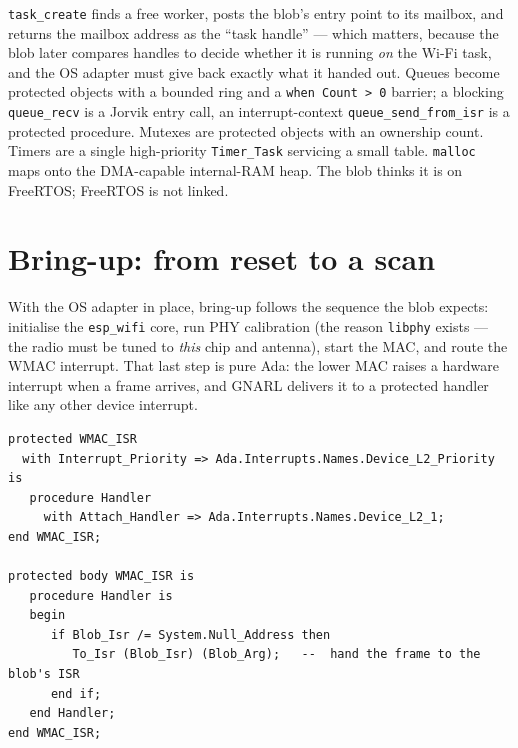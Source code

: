 \texttt{task\_create} finds a free worker, posts the blob's entry point to its
mailbox, and returns the mailbox address as the ``task handle'' --- which matters,
because the blob later compares handles to decide whether it is running
\emph{on} the Wi-Fi task, and the OS adapter must give back exactly what it
handed out. Queues become protected objects with a bounded ring and a
\texttt{when Count > 0} barrier; a blocking \texttt{queue\_recv} is a Jorvik
entry call, an interrupt-context \texttt{queue\_send\_from\_isr} is a protected
procedure. Mutexes are protected objects with an ownership count. Timers are a
single high-priority \texttt{Timer\_Task} servicing a small table. \texttt{malloc}
maps onto the DMA-capable internal-RAM heap. The blob thinks it is on FreeRTOS;
FreeRTOS is not linked.


\section{Bring-up: from reset to a scan}
\label{ch:wifi:bringup}

With the OS adapter in place, bring-up follows the sequence the blob expects:
initialise the \texttt{esp\_wifi} core, run PHY calibration (the reason
\texttt{libphy} exists --- the radio must be tuned to \emph{this} chip and
antenna), start the MAC, and route the WMAC interrupt. That last step is pure
Ada: the lower MAC raises a hardware interrupt when a frame arrives, and GNARL
delivers it to a protected handler like any other device interrupt.

\begin{lstlisting}
protected WMAC_ISR
  with Interrupt_Priority => Ada.Interrupts.Names.Device_L2_Priority
is
   procedure Handler
     with Attach_Handler => Ada.Interrupts.Names.Device_L2_1;
end WMAC_ISR;

protected body WMAC_ISR is
   procedure Handler is
   begin
      if Blob_Isr /= System.Null_Address then
         To_Isr (Blob_Isr) (Blob_Arg);   --  hand the frame to the blob's ISR
      end if;
   end Handler;
end WMAC_ISR;
\end{lstlisting}

